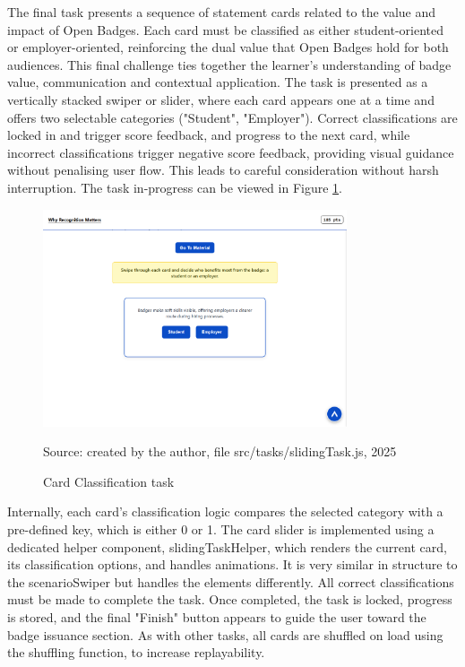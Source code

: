 The final task presents a sequence of statement cards related to the value and impact of Open Badges. 
Each card must be classified as either student-oriented or employer-oriented, reinforcing the dual value that Open Badges hold for both audiences. 
This final challenge ties together the learner’s understanding of badge value, communication and contextual application. 
The task is presented as a vertically stacked swiper or slider, where each card appears one at a time and offers two selectable categories ("Student", "Employer"). 
Correct classifications are locked in and trigger score feedback, and progress to the next card, while incorrect classifications trigger negative score feedback, providing visual guidance without penalising user flow. 
This leads to careful consideration without harsh interruption. 
The task in-progress can be viewed in Figure \ref{fig:swiperTask}.

\begin{figure}[hbtp]
\centering
\includegraphics[width=0.8\textwidth]{Media/swiper.png}
\caption{Card Classification task}
\label{fig:swiperTask}
{\raggedright \small{Source: created by the author, file src/tasks/slidingTask.js}, 2025\par}
\end{figure}

Internally, each card's classification logic compares the selected category with a pre-defined key, which is either 0 or 1. 
The card slider is implemented using a dedicated helper component, slidingTaskHelper, which renders the current card, its classification options, and handles animations. 
It is very similar in structure to the scenarioSwiper but handles the elements differently. 
All correct classifications must be made to complete the task. 
Once completed, the task is locked, progress is stored, and the final "Finish" button appears to guide the user toward the badge issuance section. 
As with other tasks, all cards are shuffled on load using the shuffling function, to increase replayability. 

